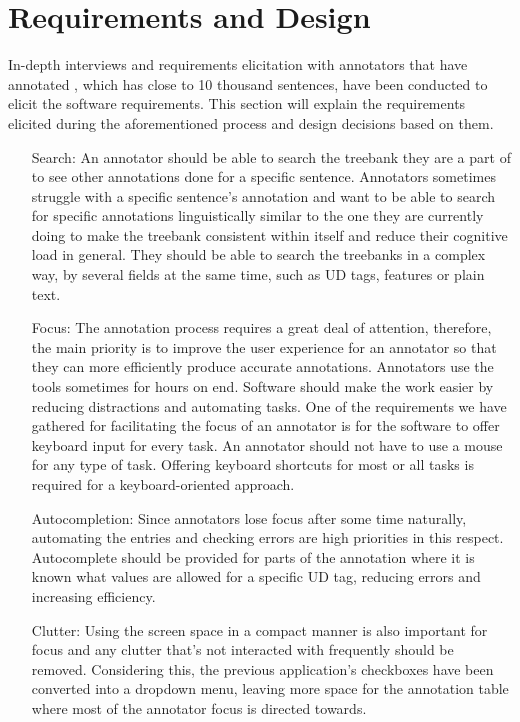 \section{Requirements and Design}
\label{sec:requirements}

In-depth interviews and requirements elicitation with annotators that have annotated \bountreebank{}, which has close to 10 thousand sentences, have been conducted to elicit the software requirements.
This section will explain the requirements elicited during the aforementioned process and design decisions based on them.

\begin{itemize}[before=\normalfont, font=\itshape, align=left]
\item[Search:]
An annotator should be able to search the treebank they are a part of to see other annotations done for a specific sentence.
Annotators sometimes struggle with a specific sentence's annotation and want to be able to search for specific annotations linguistically similar to the one they are currently doing to make the treebank consistent within itself and reduce their cognitive load in general.
They should be able to search the treebanks in a complex way, by several fields at the same time, such as UD tags, features or plain text.

\item[Focus:]
The annotation process requires a great deal of attention, therefore, the main priority is to improve the user experience for an annotator so that they can more efficiently produce accurate annotations.
Annotators use the tools sometimes for hours on end.
Software should make the work easier by reducing distractions and automating tasks.
One of the requirements we have gathered for facilitating the focus of an annotator is for the software to offer keyboard input for every task.
An annotator should not have to use a mouse for any type of task.
Offering keyboard shortcuts for most or all tasks is required for a keyboard-oriented approach.

\item[Autocompletion:]
Since annotators lose focus after some time naturally, automating the entries and checking errors are high priorities in this respect.
Autocomplete should be provided for parts of the annotation where it is known what values are allowed for a specific UD tag, reducing errors and increasing efficiency.

\item[Clutter:]
Using the screen space in a compact manner is also important for focus and any clutter that's not interacted with frequently should be removed.
Considering this, the previous application's checkboxes have been converted into a dropdown menu, leaving more space for the annotation table where most of the annotator focus is directed towards.


\end{itemize}
